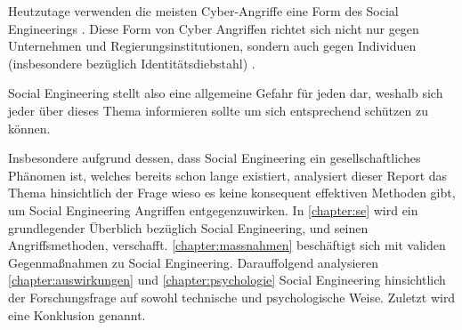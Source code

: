 Heutzutage verwenden die meisten Cyber-Angriffe eine Form des Social Engineerings .
Diese Form von Cyber Angriffen richtet sich nicht nur gegen Unternehmen und Regierungsinstitutionen,
sondern auch gegen Individuen (insbesondere bezüglich Identitätsdiebstahl) .

Social Engineering stellt also eine allgemeine Gefahr für jeden dar, weshalb sich jeder über dieses
Thema informieren sollte um sich entsprechend schützen zu können.

Insbesondere aufgrund dessen, dass Social Engineering ein gesellschaftliches Phänomen ist, welches bereits
schon lange existiert, analysiert dieser Report das Thema hinsichtlich der Frage wieso es keine konsequent effektiven
Methoden gibt, um Social Engineering Angriffen entgegenzuwirken.
In \autoref{chapter:se} wird ein grundlegender Überblich bezüglich Social Engineering, und seinen Angriffsmethoden, verschafft.
\autoref{chapter:massnahmen} beschäftigt sich mit validen Gegenmaßnahmen zu Social Engineering.
Darauffolgend analysieren \autoref{chapter:auswirkungen} und \autoref{chapter:psychologie} Social Engineering hinsichtlich der
Forschungsfrage auf sowohl technische und psychologische Weise. Zuletzt wird eine Konklusion genannt.
